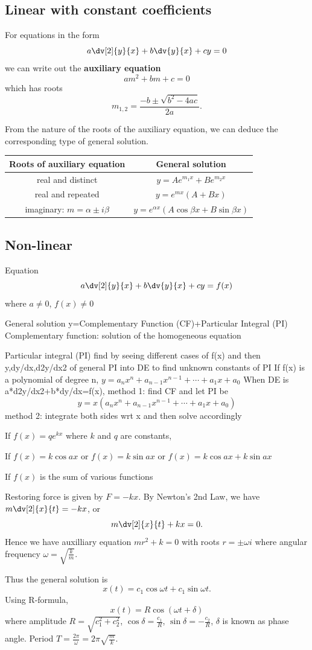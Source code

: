 \subsection{Linear with constant coefficients}
For equations in the form 
\[ a\dv[2]{y}{x} + b\dv{y}{x} +cy = 0 \]
we can write out the \textbf{auxiliary equation}
\[ am^2+bm+c=0 \]
which has roots
\[ m_{1,2}=\frac{-b\pm \sqrt{b^2-4ac}}{2a}. \]

From the nature of the roots of the auxiliary equation, we can deduce the corresponding type of general solution.
\begin{table}[H]
\centering
\begin{tabular}{c|c}
\hline\hline
\textbf{Roots of auxiliary equation} & \textbf{General solution} \\
\hline
real and distinct & $y=Ae^{m_1x}+Be^{m_2x}$ \\
real and repeated & $y=e^{mx}(A+Bx)$ \\
imaginary: $m=\alpha\pm i\beta$ & $y=e^{\alpha x}(A\cos\beta x+B\sin\beta x)$ \\
\hline\hline
\end{tabular}
\end{table}

\subsection{Non-linear}
Equation
\[ a\dv[2]{y}{x} + b\dv{y}{x} +cy = f(x) \]
where $a\neq0$, $f(x)\neq0$

General solution y=Complementary Function (CF)+Particular Integral (PI)
Complementary function: solution of the homogeneous equation

Particular integral (PI)
find by seeing different cases of f(x) and then y,dy/dx,d2y/dx2 of general PI into DE to find unknown constants of PI
If f(x) is a polynomial of degree n, $y=a_nx^n+a_{n-1}x^{n-1}+\cdots+a_1x+a_0$
When DE is a*d2y/dx2+b*dy/dx=f(x),
method 1: find CF and let PI be
\[ y=x(a_nx^n+a_{n-1}x^{n-1}+\cdots+a_1x+a_0) \]
method 2: integrate both sides wrt x and then solve accordingly

If $f(x)=qe^{kx}$ where $k$ and $q$ are constants, 

If $f(x)=k\cos ax$ or $f(x)=k\sin ax$ or $f(x)=k\cos ax+k\sin ax$

If $f(x)$ is the sum of various functions

\begin{example}
Restoring force is given by $F=-kx$. By Newton's 2nd Law, we have $m\dv[2]{x}{t}=-kx$, or
\[ m\dv[2]{x}{t}+kx=0. \]
Hence we have auxilliary equation $mr^2+k=0$ with roots $r=\pm\omega i$ where angular frequency $\omega=\sqrt{\frac{k}{m}}$.

Thus the general solution is
\[ x(t)=c_1\cos\omega t+c_1\sin\omega t. \]
Using R-formula,
\[ x(t)=R\cos(\omega t+\delta) \]
where amplitude $R=\sqrt{c_1^2+c_2^2}$, $\cos\delta=\frac{c_1}{R}$, $\sin\delta=-\frac{c_2}{R}$, $\delta$ is known as phase angle. Period $T=\frac{2\pi}{\omega}=2\pi\sqrt{\frac{m}{k}}$.
\end{example}

